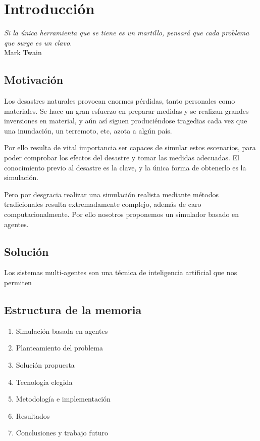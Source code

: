
\chapter*{Introducción} \label{cap0}


\begin{flushright}
\begin{minipage}{7.85cm}
    {\em Si la única herramienta que se tiene es un martillo, pensará que cada
    problema que surge es un clavo.} \\  Mark Twain
\end{minipage}
\end{flushright}

\vspace*{5mm}

\section*{Motivación}

Los desastres naturales provocan enormes pérdidas, tanto personales como
materiales. Se hace un gran esfuerzo en preparar medidas y se realizan grandes
inversiones en material, y aún así siguen produciéndose tragedias cada vez que
una inundación, un terremoto, etc, azota a algún país.

Por ello resulta de vital importancia ser capaces de simular estos escenarios,
para poder comprobar los efectos del desastre y tomar las medidas adecuadas. El
conocimiento previo al desastre es la clave, y la única forma de obtenerlo es
la simulación.

Pero por desgracia realizar una simulación realista mediante métodos
tradicionales resulta extremadamente complejo, además de caro
computacionalmente. Por ello nosotros proponemos un simulador basado en agentes.

\section*{Solución}

Los sistemas multi-agentes son una técnica de inteligencia artificial que nos
permiten

\section*{Estructura de la memoria}

\begin{enumerate}
 \item Simulación basada en agentes
 \item Planteamiento del problema
 \item Solución propuesta
 \item Tecnología elegida
 \item Metodología e implementación
 \item Resultados
 \item Conclusiones y trabajo futuro
\end{enumerate}